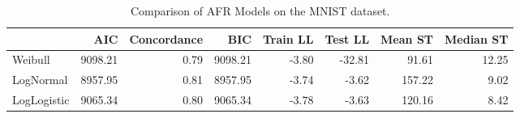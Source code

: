 \begin{table}
\caption{Comparison of AFR Models on the MNIST dataset.}
\label{tab:mnist}
\begin{tabular}{lrrrrrrr}
\toprule
 & AIC & Concordance & BIC & Train LL & Test LL & Mean ST & Median ST \\
\midrule
Weibull & 9098.21 & 0.79 & 9098.21 & -3.80 & -32.81 & 91.61 & 12.25 \\
LogNormal & 8957.95 & 0.81 & 8957.95 & -3.74 & -3.62 & 157.22 & 9.02 \\
LogLogistic & 9065.34 & 0.80 & 9065.34 & -3.78 & -3.63 & 120.16 & 8.42 \\
\bottomrule
\end{tabular}
\end{table}
